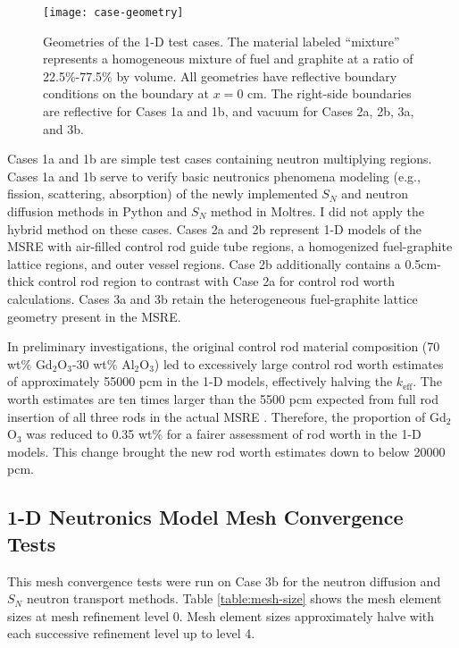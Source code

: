 \begin{figure}[htb!]
  \centering
  \texttt{[image: case-geometry]}
  \caption{Geometries of the 1-D test cases. The material labeled ``mixture'' represents a
    homogeneous mixture of fuel and graphite at a ratio of 22.5\%-77.5\% by volume. All geometries
    have reflective boundary conditions on the boundary at $x=0$ cm. The right-side boundaries are
    reflective for Cases 1a and 1b, and vacuum for Cases 2a, 2b, 3a, and 3b.}
  \label{fig:case-geom}
\end{figure}

Cases 1a and 1b are simple test cases containing neutron multiplying regions. Cases 1a and 1b serve
to verify basic neutronics phenomena modeling (e.g., fission, scattering, absorption) of the newly
implemented $S_N$ and neutron diffusion methods in Python and $S_N$ method in Moltres. I did not
apply the hybrid method on these cases. Cases 2a and 2b represent 1-D models of the \gls{MSRE} with
air-filled control rod guide tube regions, a homogenized fuel-graphite lattice regions, and outer
vessel regions. Case 2b additionally contains a 0.5cm-thick control rod region to contrast with
Case 2a for control rod worth calculations. Cases 3a and 3b retain the heterogeneous fuel-graphite
lattice geometry present in the \gls{MSRE}.

In preliminary investigations, the original control rod material composition
(70 wt\% Gd$_2$O$_3$-30 wt\% Al$_2$O$_3$) led to excessively large control rod worth estimates of
approximately 55000 pcm in the 1-D models, effectively halving the $k_\text{eff}$. The worth
estimates are ten times larger
than the 5500 pcm expected from full rod insertion of all three rods in the actual \gls{MSRE}
\cite{fratoni_molten_2020}. Therefore, the proportion of Gd$_2$O$_3$ was reduced to 0.35 wt\% for a
fairer assessment of rod worth in the 1-D models. This change
brought the new rod worth estimates down to below 20000 pcm.

\subsection{1-D Neutronics Model Mesh Convergence Tests}

This mesh convergence tests were run on Case 3b for the neutron diffusion and $S_N$ neutron
transport methods. Table \ref{table:mesh-size} shows the mesh element sizes at mesh refinement
level 0. Mesh element sizes approximately halve with each successive refinement level up to level 4.

